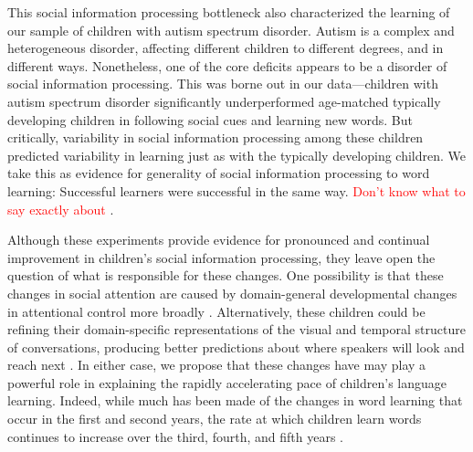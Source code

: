 \documentclass{pnastwo}
\newcommand{\red}[1]{\textcolor{red}{#1}}
\begin{document}
\begin{article}
This social information processing bottleneck also characterized the learning of our sample of children with autism spectrum disorder. Autism is a complex and heterogeneous disorder, affecting different children to different degrees, and in different ways. Nonetheless, one of the core deficits appears to be a disorder of social information processing. This was borne out in our data---children with autism spectrum disorder significantly underperformed age-matched typically developing children in following social cues and learning new words. But critically, variability in social information processing among these children predicted variability in learning just as with the typically developing children.  We take this as evidence for generality of social information processing to word learning: Successful learners were successful in the same way. \red{Don't know what to say exactly about \citep{plomin2016}}.

Although these experiments provide evidence for pronounced and continual improvement in children's social information processing, they leave open the question of what is responsible for these changes. One possibility is that these changes in social attention are caused by domain-general developmental changes in attentional control more broadly \citep{rueda2005,smith2013}. Alternatively, these children could be refining their domain-specific representations of the visual and temporal structure of conversations, producing better predictions about where speakers will look and reach next \citep{acheson2009,krogh-jespersen2015}. In either case, we propose that these changes have may play a powerful role in explaining the rapidly accelerating pace of children's language learning. Indeed, while much has been made of the changes in word learning that occur in the first and second years, the rate at which children learn words continues to increase over the third, fourth, and fifth years \citep{bloom2000}. 


\end{article}
\end{document}
